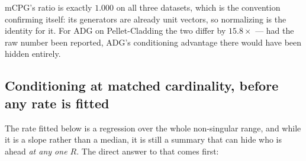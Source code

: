 \documentclass[11pt,a4paper]{article}
\begin{document}
\noindent mCPG's ratio is exactly $1.000$ on all three datasets, which is the convention
confirming itself: its generators are already unit vectors, so normalizing is the identity
for it. For ADG on Pellet-Cladding the two differ by $15.8\times$ --- had the raw number
been reported, ADG's conditioning advantage there would have been hidden entirely.

\subsection{Conditioning at matched cardinality, before any rate is fitted}

The rate fitted below is a regression over the whole non-singular range, and while it is
a slope rather than a median, it is still a summary that can hide who is ahead \emph{at
any one $R$}. The direct answer to that comes first:
\end{document}
